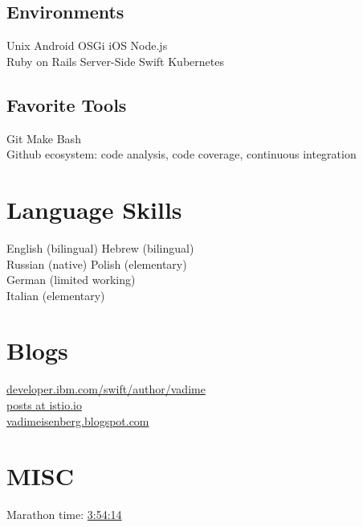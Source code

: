 \documentclass[]{deedy-resume}
\begin{document}
\begin{minipage}[t]{0.33\textwidth}
\subsection{Environments}
Unix \textbullet{}  Android \textbullet{}  OSGi \textbullet{} iOS \textbullet{} Node.js \\
Ruby on Rails \textbullet{} Server-Side Swift \textbullet{} Kubernetes
\sectionsep

\subsection{Favorite Tools}
Git \textbullet{}  Make \textbullet{}  Bash \textbullet{} \\
Github ecosystem: code analysis, code coverage, continuous integration
\sectionsep

\section{Language Skills}
\vspace{\topsep} %
English (bilingual) \textbullet{} Hebrew (bilingual) \\
Russian (native)  \textbullet{} Polish (elementary) \\
German (limited working) \\
Italian (elementary)
\sectionsep

\section{Blogs}
\href{https://developer.ibm.com/swift/author/vadime/}{developer.ibm.com/swift/author/vadime} \\
\href{https://istio.io/search.html?q=vadim\%20eisenberg}{posts at istio.io} \\
\href{http://vadimeisenberg.blogspot.com}{vadimeisenberg.blogspot.com}
\sectionsep

\section{MISC}
Marathon time: \href{http://pzumaratonwarszawski.com/wp-content/uploads/2017/10/39PZUMaratonWarszawski_FIN.pdf}{3:54:14}

%
%

\end{minipage}
\end{document}
